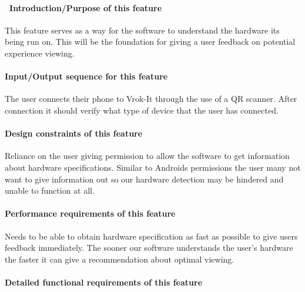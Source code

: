 \documentclass[letterpaper, 10pt, draftclsnofoot, onecolumn]{IEEEtran}
\begin{document}
{\paragraph[\ Introduction/Purpose of this
feature]{\foreignlanguage{english}{\ }\foreignlanguage{english}{Introduction/Purpose
of this feature}}
{\color{black}
This feature serves as a way for the software to understand the hardware its being run on. This will be the foundation for giving a user feedback on potential experience viewing. }

\paragraph[Input/Output sequence for this
feature]{\rmfamily\bfseries\color{black}
Input/Output sequence for this feature}
{\color{black}
The user connects their phone to Vrok-It through the use of a QR scanner. After connection it should verify what type of device that the user has connected. }

\paragraph[Design constraints of this
feature]{\rmfamily\bfseries\color{black} Design
constraints of this feature}
{\color{black}
Reliance on the user giving permission to allow the software to get information about hardware specifications. Similar to Androids permissions the user many not want to give information out so our hardware detection may be hindered and unable to function at all. }

\paragraph[Performance requirements of this
feature]{\rmfamily\bfseries\color{black}
Performance requirements of this feature}
{\color{black}
Needs to be able to obtain hardware specification as fast as possible to give users feedback immediately. The sooner our software understands the user's hardware the faster it can give a recommendation about optimal viewing. }

\paragraph[Detailed functional requirements of this
feature]{\rmfamily\bfseries\color{black}
Detailed functional requirements of this feature}



}
\end{document}
